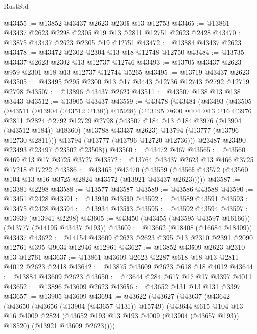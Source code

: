 \begin{lexlean}{RustStd}
\begin{coremodule}
@43455 := @13852 @43437 @2623 @2306 @13 @12753
@43465 := @13861 @43437 @2623 @2298 @2305 @19 @13 @2811 @12751 @2623 @2428
@43470 := @13875 @43437 @2623 @2305 @19 @12751
@43472 := @13884 @43437 @2623
@43478 := @43472 @2302 @2304 @13 @18 @12748 @12750
@43484 := @13735 @43437 @2623 @2302 @13 @12737 @12746
@43493 := @13705 @43437 @2623 @959 @2301 @18 @13 @12737 @12744 @5265
@43495 := @13719 @43437 @2623
@43505 := @43495 @295 @2300 @13 @17 @3443 @12736 @12743 @2792 @12719 @2798
@43507 := @13896 @43437 @2623
@43511 := @43507 @138 @13 @138 @3443
@43512 := @13905 @43437
@43559 := @43478
    (@43484
      (@43493
        (@43505
          (@43511 (@13904 (@43512 @138)) @15928)
          (@43495
            @600
            @104
            @13
            @16
            @3976
            @2811
            @2824
            @2792
            @12729
            @2798
            (@43507 @184 @13 @184 @3976 (@13904 (@43512 @184)) @18360)
            (@13788 @43437 @2623)
            @13794
            (@13777 (@13796 @12730 @2811)))
          @13794
          (@13777 (@13796 @12720 @12736)))
        @23487
        @23490
        @23493
        @23497
        @23502
        @23508))
@43560 := @43472 @467
@43565 := @43560 @469 @13 @17 @3725 @3727
@43572 := @13764 @43437 @2623 @13 @466 @3725 @17218 @17222
@43586 := @43465
    (@43470 (@43559 (@43565 @43572 (@43560 @104 @13 @16 @3725 @2824 @43572 (@13921 @43437 @2623)))))
@43587 := @13381 @2298
@43588 := @13577 @43587
@43589 := @43586 @43588
@43590 := @13451 @2428
@43591 := @13930 @43590
@43592 := @43589 @43591
@43593 := @13475 @2428
@43594 := @13934 @43593
@43595 := @43592 @43594
@43597 := @13939 (@13941 @2298)
@43605 := @43450 (@43455 (@43595 @43597 @16166)) (@13777 (@14195 @43437 @193))
@43609 := @13662 (@18408 (@16684 @18409)) @43437
@43622 := @14154 @43609 @2623 @2623 @395 @13 @2310 @2391 @2090 @12761 @395 @9034 @12946 @12961
@43627 := @13852 @43609 @2623 @2310 @13 @12761
@43637 := @13861 @43609 @2623 @2287 @618 @18 @13 @2811 @4012 @2623 @2418
@43642 := @13875 @43609 @2623 @618 @18 @4012
@43644 := @13884 @43609 @2623
@43650 := @43644 @284 @617 @13 @17 @3397 @4011
@43652 := @13896 @43609 @2623
@43656 := @43652 @131 @13 @131 @3397
@43657 := @13905 @43609
@43694 := @43622
    (@43627
      (@43637
        (@43642
          (@43650
            (@43656 (@13904 (@43657 @131)) @15749)
            (@43644
              @615
              @104
              @13
              @16
              @4009
              @2824
              (@43652 @193 @13 @193 @4009 (@13904 (@43657 @193)) @18520)
              (@13921 @43609 @2623))))

\end{coremodule}
\end{lexlean}
